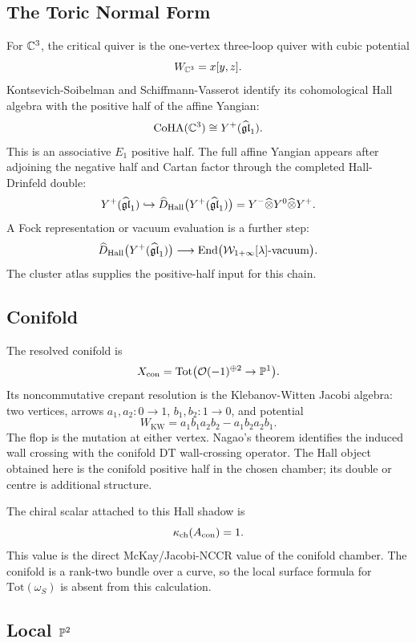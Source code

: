 \subsection*{The Toric Normal Form}

For $\mathbb{C}^3$, the critical quiver is the one-vertex three-loop quiver
with cubic potential
\[
  W_{\mathbb{C}^3}=x[y,z].
\]
Kontsevich-Soibelman and Schiffmann-Vasserot identify its cohomological
Hall algebra with the positive half of the affine Yangian:
\[
  \mathrm{CoHA}(\mathbb{C}^3)\cong Y^{+}(\widehat{\mathfrak{gl}}_1).
\]
This is an associative $E_1$ positive half.  The full affine Yangian
appears after adjoining the negative half and Cartan factor through
the completed Hall-Drinfeld double:
\[
  Y^{+}(\widehat{\mathfrak{gl}}_1)
  \hookrightarrow
  \widehat D_{\mathrm{Hall}}
  \bigl(Y^{+}(\widehat{\mathfrak{gl}}_1)\bigr)
  =
  Y^-\widehat\otimes Y^0\widehat\otimes Y^{+}.
\]
A Fock representation or vacuum evaluation is a further step:
\[
  \widehat D_{\mathrm{Hall}}
  \bigl(Y^{+}(\widehat{\mathfrak{gl}}_1)\bigr)
  \longrightarrow
  \mathrm{End}\bigl(\mathcal W_{1+\infty}[\lambda]\text{-vacuum}\bigr).
\]
The cluster atlas supplies the positive-half input for this chain.

\subsection*{Conifold}

The resolved conifold is
\[
  X_{\mathrm{con}}=
  \mathrm{Tot}\bigl(\mathcal O(-1)^{\oplus2}\to\mathbb{P}^1\bigr).
\]
Its noncommutative crepant resolution is the Klebanov-Witten Jacobi
algebra: two vertices, arrows
$a_1,a_2:0\to1$, $b_1,b_2:1\to0$, and potential
\[
  W_{\mathrm{KW}}
  =
  a_1b_1a_2b_2-a_1b_2a_2b_1.
\]
The flop is the mutation at either vertex.  Nagao's theorem identifies
the induced wall crossing with the conifold DT wall-crossing operator.
The Hall object obtained here is the conifold positive half in the
chosen chamber; its double or centre is additional structure.

The chiral scalar attached to this Hall shadow is
\[
  \kappa_{\mathrm{ch}}(A_{\mathrm{con}})=1.
\]
This value is the direct McKay/Jacobi-NCCR value of the conifold
chamber.  The conifold is a rank-two bundle over a curve, so the local
surface formula for $\mathrm{Tot}(\omega_S)$ is absent from this
calculation.

\subsection*{Local $\mathbb{P}^2$}

